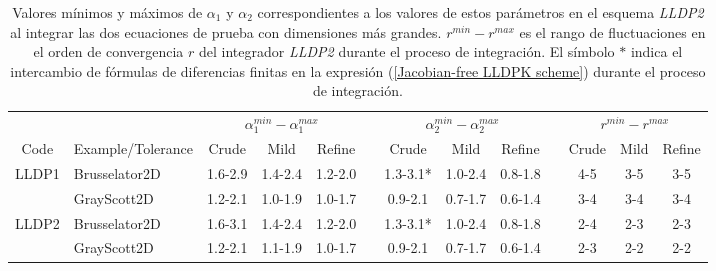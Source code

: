 \begin{table}
    \caption{Valores mínimos y máximos de $\alpha _{1}$ y $\alpha _{2}$ correspondientes a los valores de estos parámetros en el esquema \emph{LLDP2} al integrar las dos ecuaciones de prueba con dimensiones más grandes. $r^{min}-r^{max}$ es el rango de fluctuaciones en el orden de convergencia $r$ del integrador \emph{LLDP2} durante el proceso de integración. El símbolo $*$ indica el intercambio de fórmulas de diferencias finitas en la expresión (\ref{Jacobian-free LLDPK scheme}) durante el proceso de integración.}
    \label{tab:R_LLDP1_LLDP2}
    \begin{adjustbox}{width=0.95\columnwidth,center}
        \begin{tabular}{ccccccccccccc}
            &  & \multicolumn{3}{c}{$\alpha _{1}^{min}-\alpha _{1}^{max}$} &  &
            \multicolumn{3}{c}{$\alpha _{2}^{min}-\alpha _{2}^{max}$} &  &
            \multicolumn{3}{c}{$r^{min}-r^{max}$} \\ \cline{3-5}\cline{7-9}\cline{11-13}
            Code & \multicolumn{1}{l}{Example/Tolerance} & Crude & Mild & Refine &  &
            Crude & Mild & Refine &  & Crude & Mild & Refine \\ \hline
            LLDP1 & \multicolumn{1}{l}{Brusselator2D} & 1.6-2.9 & 1.4-2.4 & 1.2-2.0 &  &
            1.3-3.1* & 1.0-2.4 & 0.8-1.8 &  & 4-5 & 3-5 & 3-5 \\
            & \multicolumn{1}{l}{GrayScott2D} & 1.2-2.1 & 1.0-1.9 & 1.0-1.7 &  & 0.9-2.1
            & 0.7-1.7 & 0.6-1.4 &  & 3-4 & 3-4 & 3-4 \\
            LLDP2 & \multicolumn{1}{l}{Brusselator2D} & 1.6-3.1 & 1.4-2.4 & 1.2-2.0 &  &
            1.3-3.1* & 1.0-2.4 & 0.8-1.8 &  & 2-4 & 2-3 & 2-3 \\
            & \multicolumn{1}{l}{GrayScott2D} & 1.2-2.1 & 1.1-1.9 & 1.0-1.7 &  & 0.9-2.1
            & 0.7-1.7 & 0.6-1.4 &  & 2-3 & 2-2 & 2-2 \\ \hline
        \end{tabular}

    \end{adjustbox}
\end{table}

